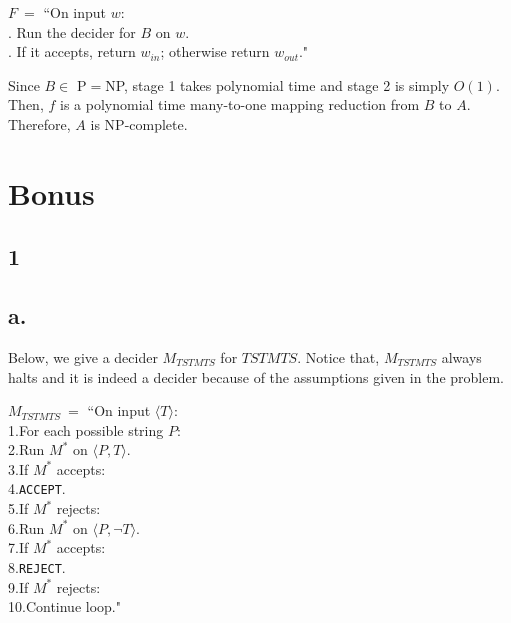\documentclass[12pt]{article}
\begin{document}
$F \ =$ ``On input $w$:\\
	\indent{}.  Run the decider for $B$ on $w$.\\
	\indent{}. If it accepts, return $w_{in}$; otherwise return $w_{out}$."

Since $B \in$ P$=$NP, stage 1 takes polynomial time and stage 2 is simply $O(1)$. Then, $f$ is a polynomial time many-to-one mapping reduction from $B$ to $A$. Therefore, $A$ is NP-complete.



\section*{Bonus}


\subsection*{1}

\subsection*{a.}

Below, we give a decider $M_{TSTMTS}$  for $TSTMTS$. Notice that, $M_{TSTMTS}$ always halts and it is indeed a decider because of the assumptions given in the problem.

\noindent
$M_{TSTMTS} \ =$ ``On input $\langle T\rangle$:\\
	1.\indent\indent For each possible string $P$:\\
	2.\indent\indent\indent\indent Run $M^*$ on $\langle P, T \rangle$.\\
	3.\indent\indent\indent\indent If $M^*$ accepts:\\
	4.\indent\indent\indent\indent\indent\indent \texttt{ACCEPT}.\\
	5.\indent\indent\indent\indent If $M^*$ rejects:\\
	6.\indent\indent\indent\indent\indent\indent Run $M^*$ on $\langle P, \neg T \rangle$.\\
	7.\indent\indent\indent\indent\indent\indent If $M^*$ accepts:\\
	8.\indent\indent\indent\indent\indent\indent\indent\indent \texttt{REJECT}.\\
	9.\indent\indent\indent\indent\indent\indent If $M^*$ rejects:\\
	10.\indent\indent\indent\indent\indent\indent\indent\indent  Continue loop."\\
\end{document}
